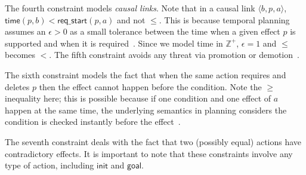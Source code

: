 \documentclass{ecai}
\newcommand{\tup}[1]{{\langle #1 \rangle}}
\newcommand{\tim}{\mathsf{time}}   %
\newcommand{\reqs}{\mathsf{req\_{start}}} %
\newcommand{\ini}{\mathsf{init}}   %
\newcommand{\goal}{\mathsf{goal}}  %
\begin{document}
The fourth constraint models {\em causal links}. Note that in a causal link $\tup{b,p,a}$, $\tim(p,b) < \reqs(p,a)$ and not $\leq$. This is because temporal planning assumes an $\epsilon > 0$ as a small tolerance between the time when a given effect $p$ is supported and when it is required~\cite{fox2003pddl2}. Since we model time in $\mathbb{Z}^+$, $\epsilon=1$ and $\leq$ becomes $<$. The fifth constraint avoids any threat via promotion or demotion~\cite{ghallab2004automated}.

The sixth constraint models the fact that when the same action requires and deletes $p$ then the effect cannot happen before the condition. Note the $\geq$ inequality here; this is possible because if one condition and one effect of $a$ happen at the same time, the underlying semantics in planning considers the condition is checked instantly before the effect~\cite{fox2003pddl2}.

The seventh constraint deals with the fact that two (possibly equal) actions have contradictory effects. It is important to note that these constraints involve any type of action, including $\ini$ and $\goal$.
\end{document}
